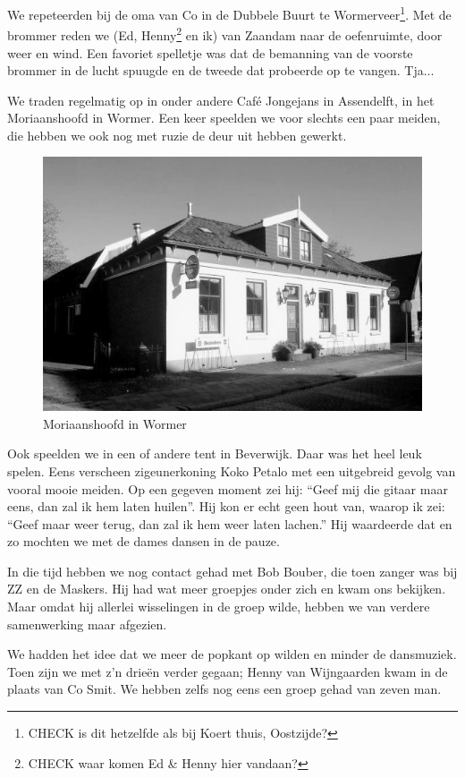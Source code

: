 \documentclass[10pt,twoside, openright]{memoir}
\begin{document}
We repeteerden bij de oma van Co in de Dubbele Buurt te Wormerveer\footnote{CHECK is dit hetzelfde als bij Koert thuis, Oostzijde?}. Met de brommer reden we (Ed, Henny\footnote{CHECK waar komen Ed & Henny hier vandaan?} en ik) van Zaandam naar de oefenruimte, door weer en wind. Een favoriet spelletje was dat de bemanning van de voorste brommer in de lucht spuugde en de tweede dat probeerde op te vangen. Tja...

We traden regelmatig op in onder andere Café Jongejans in Assendelft, in het Moriaanshoofd in Wormer. Een keer speelden we voor slechts een paar meiden, die hebben we ook nog met ruzie de deur uit hebben gewerkt. 

\begin{figure}
\includegraphics[width=\textwidth]{img/ch26/Moriaanshoofd}
\caption*{\footnotesize Moriaanshoofd in Wormer}
\end{figure}

Ook speelden we in een of andere tent in Beverwijk. Daar was het heel leuk spelen. Eens verscheen zigeunerkoning Koko Petalo met een uitgebreid gevolg van vooral mooie meiden. Op een gegeven moment zei hij: ``Geef mij die gitaar maar eens, dan zal ik hem laten huilen''. Hij kon er echt geen hout van, waarop ik zei: ``Geef maar weer terug, dan zal ik hem weer laten lachen.'' Hij waardeerde dat en zo mochten we met de dames dansen in de pauze.

In die tijd hebben we nog contact gehad met Bob Bouber, die toen zanger was bij ZZ en de Maskers. Hij had wat meer groepjes onder zich en kwam ons bekijken. Maar omdat hij allerlei wisselingen in de groep wilde, hebben we van verdere samenwerking maar afgezien. 

We hadden het idee dat we meer de popkant op wilden en minder de dansmuziek. Toen zijn we met z’n drieën verder gegaan; Henny van Wijngaarden kwam in de plaats van Co Smit. We hebben zelfs nog eens een groep gehad van zeven man.
\end{document}

